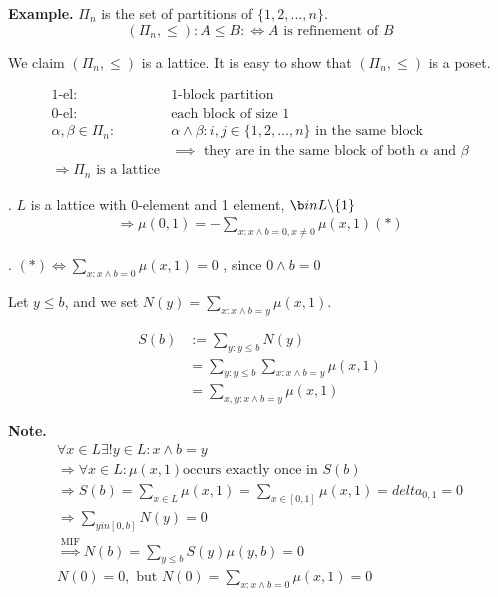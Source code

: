 \textbf{Example.}
$\Pi_n$ is the set of partitions of $\{1,2,..., n\}$. 
\[
    (\Pi_n, \leq): A \leq B: \iff \text{$A$ is refinement of $B$}
\]

We claim $(\Pi_n, \leq)$ is a lattice. 
It is easy to show that $(\Pi_n, \leq)$ is a poset. 

\begin{align*}
  \text{1-el}: & \text{1-block partition} \\
  \text{0-el}: & \text{each block of size 1} \\
  \alpha, \beta \in \Pi_n: & \alpha \wedge \beta: i,j \in \{1,2,\ldots,n\} 
    \text{ in the same block } \\
    & \implies \text{ they are in the same block of both $\alpha$ and $\beta$} \\
  \Rightarrow \Pi_n \text{ is a lattice}
\end{align*}

\Theorem.
$L$ is a lattice with 0-element and 1 element, $\b in L\backslash \{1\}$
\begin{align*}
    \Rightarrow \mu(0,1) = -\sum_{x: x\wedge b = 0, x \neq 0} \mu(x,1) (*)
\end{align*}

\Proof.
$(*) \Leftrightarrow \sum_{x: x\wedge b = 0} \mu(x,1) = 0$
, since $0 \wedge b = 0$

Let $y \leq b$, and we set $N(y) = \sum_{x: x\wedge b=y} \mu(x,1)$.

\begin{align*}
  S(b) &:= \sum_{y: y \leq b} N(y) \\
    & = \sum_{y: y \leq b} \sum_{x: x\wedge b=y} \mu(x,1) \\
    & = \sum_{x,y: x \wedge b = y} \mu(x,1)
\end{align*}

\textbf{Note.}
\begin{align*}
    \forall x \in L \exists ! y \in L : x \wedge b = y \\
    \Rightarrow \forall x \in L: \mu(x,1) \text{occurs exactly once in $S(b)$} \\
    \Rightarrow S(b) = \sum_{x \in L} \mu(x,1) = \sum_{x \in [0,1]} \mu(x,1) = delta_{0,1} = 0 \\
    \Rightarrow \sum_{y in [0,b]} N(y) = 0 \\
    \stackrel{\text{MIF}}{\Rightarrow} N(b) = \sum_{y \leq b} S(y) \mu(y,b) = 0\\
    N(0) = 0, \text{ but } N(0) = \sum_{x:x \wedge b = 0} \mu(x,1) = 0 \\
\end{align*}

